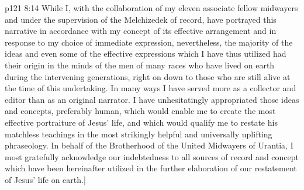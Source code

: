 \vs p121 8:14 While I, with the collaboration of my eleven associate fellow midwayers and under the supervision of the Melchizedek of record, have portrayed this narrative in accordance with my concept of its effective arrangement and in response to my choice of immediate expression, nevertheless, the majority of the ideas and even some of the effective expressions which I have thus utilized had their origin in the minds of the men of many races who have lived on earth during the intervening generations, right on down to those who are still alive at the time of this undertaking. In many ways I have served more as a collector and editor than as an original narrator. I have unhesitatingly appropriated those ideas and concepts, preferably human, which would enable me to create the most effective portraiture of Jesus’ life, and which would qualify me to restate his matchless teachings in the most strikingly helpful and universally uplifting phraseology. In behalf of the Brotherhood of the United Midwayers of Urantia, I most gratefully acknowledge our indebtedness to all sources of record and concept which have been hereinafter utilized in the further elaboration of our restatement of Jesus’ life on earth.]
\quizlink
